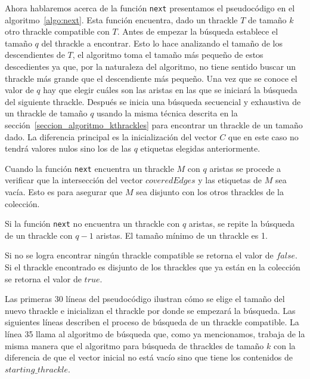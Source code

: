   Ahora hablaremos acerca de la función \texttt{next} presentamos el pseudocódigo en el algoritmo~\ref{algo:next}. Esta función encuentra, dado un thrackle $T$ de tamaño $k$ otro thrackle compatible con $T$. Antes de empezar la búsqueda establece el tamaño $q$ del thrackle a encontrar. Esto lo hace analizando el tamaño de los descendientes de $T$, el algoritmo toma el tamaño más pequeño de estos descedientes ya que, por la  naturaleza del algoritmo, no tiene sentido buscar un thrackle más grande que el descendiente más pequeño. Una vez que se conoce el valor de $q$ hay que elegir cuáles son las aristas en las que se iniciará la búsqueda del siguiente thrackle. Después se inicia una búsqueda secuencial y exhaustiva de un thrackle de tamaño $q$ usando la misma técnica descrita en la sección~\ref{seccion_algoritmo_kthrackles} para encontrar un thrackle de un tamaño dado. La diferencia principal es la inicialización del vector $C$ que en este caso no tendrá valores nulos sino los de las $q$ etiquetas elegidas anteriormente.

  Cuando la función \texttt{next} encuentra un thrackle $M$ con $q$ aristas se procede a verificar
  que la intersección del vector $coveredEdges$ y las etiquetas de $M$ sea vacía. Esto es para asegurar que
  $M$ sea disjunto con los otros thrackles de la colección.

  Si la función \texttt{next} no encuentra un thrackle con $q$ aristas, se repite la búsqueda de un
  thrackle con $q-1$ aristas. El tamaño mínimo de un thrackle es 1.

  Si no se logra encontrar ningún thrackle compatible se retorna el valor de $false$. Si el
  thrackle encontrado es disjunto de los thrackles que ya están en la colección se retorna el valor
  de $true$.

  Las primeras 30 líneas del pseudocódigo ilustran cómo se elige el tamaño del nuevo thrackle e inicializan el thrackle por donde se empezará la búsqueda. Las siguientes líneas describen el proceso de búsqueda de un thrackle compatible. La línea 35 llama al algoritmo de búsqueda que, como ya mencionamos, trabaja de la misma manera que el algoritmo para búsqueda de thrackles de tamaño $k$ con la diferencia de que el vector inicial no está vacío sino que tiene los contenidos de $starting\_thrackle$.

